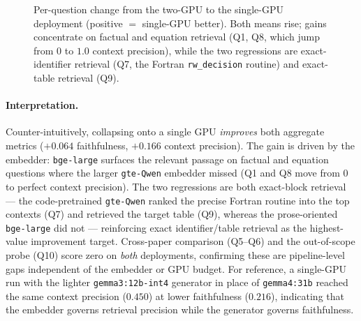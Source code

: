 \documentclass[11pt,a4paper]{article}
\newcommand{\code}[1]{\texttt{\small #1}}
\begin{document}
\begin{figure}[H]
\centering
{}
\caption{Per-question change from the two-GPU to the single-GPU deployment
(positive $=$ single-GPU better). Both means rise; gains concentrate on factual
and equation retrieval (Q1, Q8, which jump from $0$ to $1.0$ context precision),
while the two regressions are exact-identifier retrieval (Q7, the Fortran
\code{rw\_decision} routine) and exact-table retrieval (Q9).}
\label{fig:2v1delta}
\end{figure}

\paragraph{Interpretation.} Counter-intuitively, collapsing onto a single GPU
\emph{improves} both aggregate metrics ($+0.064$ faithfulness, $+0.166$ context
precision). The gain is driven by the embedder: \code{bge-large} surfaces the
relevant passage on factual and equation questions where the larger
\code{gte-Qwen} embedder missed (Q1 and Q8 move from $0$ to perfect context
precision). The two regressions are both exact-block retrieval --- the
code-pretrained \code{gte-Qwen} ranked the precise Fortran routine into the top
contexts (Q7) and retrieved the target table (Q9), whereas the prose-oriented
\code{bge-large} did not --- reinforcing exact identifier/table retrieval as the
highest-value improvement target. Cross-paper comparison (Q5--Q6) and the
out-of-scope probe (Q10) score zero on \emph{both} deployments, confirming these
are pipeline-level gaps independent of the embedder or GPU budget. For reference,
a single-GPU run with the lighter \code{gemma3:12b-int4} generator in place of
\code{gemma4:31b} reached the same context precision ($0.450$) at lower
faithfulness ($0.216$), indicating that the embedder governs retrieval precision
while the generator governs faithfulness.
\end{document}
